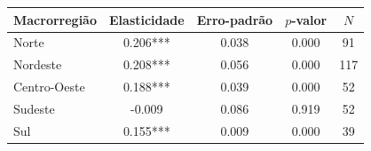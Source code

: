 \begin{tabular}{lcccc}
\toprule
Macrorregião & Elasticidade & Erro-padrão & $p$-valor & $N$ \\
\midrule
Norte & 0.206*** & 0.038 & 0.000 & 91 \\
Nordeste & 0.208*** & 0.056 & 0.000 & 117 \\
Centro-Oeste & 0.188*** & 0.039 & 0.000 & 52 \\
Sudeste & -0.009 & 0.086 & 0.919 & 52 \\
Sul & 0.155*** & 0.009 & 0.000 & 39 \\
\bottomrule
\end{tabular}
